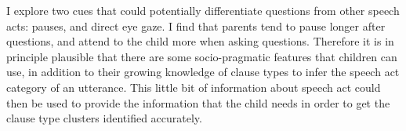 I explore two cues that could potentially differentiate questions from other speech acts: pauses, and direct eye gaze. I find that parents tend to pause longer after questions, and attend to the child more when asking questions. Therefore it is in principle plausible that there are some socio-pragmatic features that children can use, in addition to their growing knowledge of clause types to infer the speech act category of an utterance. This little bit of information about speech act could then be used to provide the information that the child needs in order to get the clause type clusters identified accurately.

